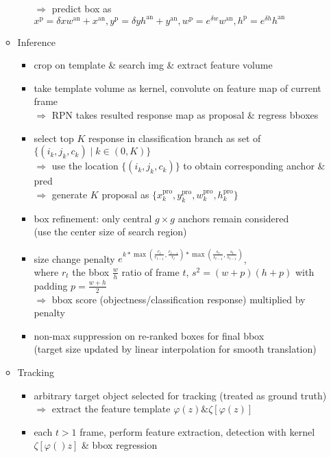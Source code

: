 \begin{itemize}
\begin{itemize}
\begin{itemize}
		$\Rightarrow$ predict box as $x^\text{p}=\delta xw^\text{an} + x^\text{an}, y^\text{p}=\delta yh^\text{an} +y^\text{an}, w^\text{p}=e^{\delta w}w^\text{an}, h^\text{p}=e^{\delta h}h^\text{an}$
		\end{itemize}
	\item Inference
		\begin{itemize}
		\item crop on template \& search img \& extract feature volume
		\item take template volume as kernel, convolute on feature map of current frame \\
		$\Rightarrow$ RPN takes resulted response map as proposal \& regress bboxes
		\item select top $K$ response in classification branch as set of $\{(i_k,j_k,c_k)\mid k\in(0,K)\}$ \\
		$\Rightarrow$ use the location $\{(i_k,j_k,c_k)\}$ to obtain corresponding anchor \& pred \\
		$\Rightarrow$ generate $K$ proposal as $\{x_k^\text{pro}, y_k^\text{pro}, w_k^\text{pro}, h_k^\text{pro}\}$
		\item box refinement: only central $g\times g$ anchors remain considered \\ 
		(use the center size of search region)
		\item size change penalty $\displaystyle e^{k*\max(\frac {r_t}{r_{t-1}}, \frac {r_{t-1}}{r_{t}})*\max(\frac {s_t}{s_{t-1}}, \frac {s_t}{s_{t-1}})}$, \\
		where $r_t$ the bbox $\frac w h$ ratio of frame $t$, $s^2=(w+p)(h+p)$ with padding $p=\frac {w+h} 2$ \\
		$\Rightarrow$ bbox score (objectness/classification response) multiplied by penalty
		\item non-max suppression on re-ranked boxes for final bbox \\ 
		(target size updated by linear interpolation for smooth translation)
		\end{itemize}
	\item Tracking
		\begin{itemize}
		\item arbitrary target object selected for tracking (treated as ground truth) \\
		$\Rightarrow$ extract the feature template $\varphi(z) \& \zeta[\varphi(z)]$
		\item each $t>1$ frame, perform feature extraction, detection with kernel $\zeta[\varphi()z]$ \& bbox regression \\

\end{itemize}
\end{itemize}
\end{itemize}
